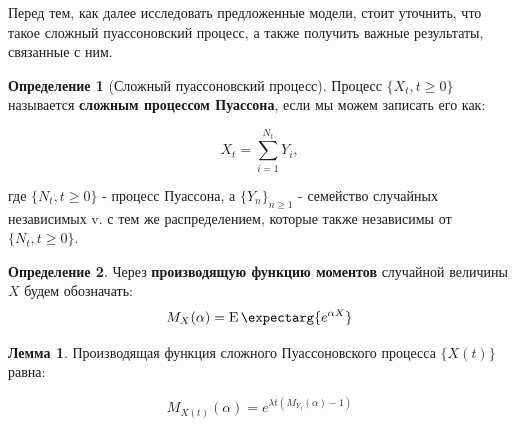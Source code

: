 \documentclass[a4paper,12pt]{article}
\theoremstyle{definition}
\newtheorem{definition}{Определение}[section]
\newtheorem{lemma}{Лемма}
\newcommand{\expect}{\operatorname{E}\expectarg}
\begin{document}
Перед тем, как далее исследовать предложенные модели, стоит уточнить, что такое сложный пуассоновский процесс, а также получить важные результаты, связанные с ним.

\begin{definition}[Сложный пуассоновский процесс]
    \label{def:compound_poisson}
    Процесс $\{X_t, t \ge 0\}$ называется \textbf{сложным процессом Пуассона}, если мы можем записать его как:
    
    \begin{equation}
        X_t = \sum_{i=1}^{N_t} Y_i,
    \end{equation}
    
    где $\{N_t, t \ge 0\}$ - процесс Пуассона, а $\{Y_n\}_{n \ge 1}$ - семейство случайных независимых v. с тем же распределением, которые также независимы от $\{N_t, t \ge 0\}$.
\end{definition}

\begin{definition}\label{def:moment_generating_function}
Через \textbf{производящую функцию моментов} случайной величины $X$ будем обозначать:
    \begin{equation*}
        M_X(\alpha) = \expect{e^{\alpha X}}
    \end{equation*}
\end{definition}

\begin{lemma}\label{thm:thm2_moment_generating_function}
Производящая функция сложного Пуассоновского процесса $\{X(t)\}$ равна:

\begin{equation}\label{eq:moment_generating_for_poisson}
     M_{X(t)}(\alpha) = e^{\lambda t \left(M_{Y_1}(\alpha) - 1\right)}
\end{equation}

\end{lemma}
\end{document}
